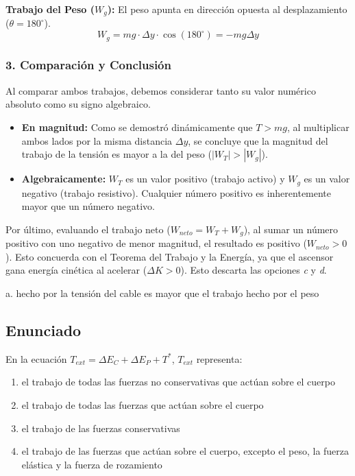 \documentclass[12pt, a4paper]{article}
\begin{document}
\textbf{Trabajo del Peso ($W_g$):}
El peso apunta en dirección opuesta al desplazamiento ($\theta = 180^\circ$).
$$W_g = mg \cdot \Delta y \cdot \cos(180^\circ) = -mg \Delta y$$

\subsubsection*{3. Comparación y Conclusión}
Al comparar ambos trabajos, debemos considerar tanto su valor numérico absoluto como su signo algebraico.
\begin{itemize}
    \item \textbf{En magnitud:} Como se demostró dinámicamente que $T > mg$, al multiplicar ambos lados por la misma distancia $\Delta y$, se concluye que la magnitud del trabajo de la tensión es mayor a la del peso ($|W_T| > |W_g|$).
    \item \textbf{Algebraicamente:} $W_T$ es un valor positivo (trabajo activo) y $W_g$ es un valor negativo (trabajo resistivo). Cualquier número positivo es inherentemente mayor que un número negativo.
\end{itemize}

Por último, evaluando el trabajo neto ($W_{neto} = W_T + W_g$), al sumar un número positivo con uno negativo de menor magnitud, el resultado es positivo ($W_{neto} > 0$). Esto concuerda con el Teorema del Trabajo y la Energía, ya que el ascensor gana energía cinética al acelerar ($\Delta K > 0$). Esto descarta las opciones \textit{c} y \textit{d}.

\begin{tcolorbox}[colback=green!5!white, colframe=green!50!black, title=Respuesta Correcta]
\centering \Large a. hecho por la tensión del cable es mayor que el trabajo hecho por el peso
\end{tcolorbox}

\newpage

\subsection*{Enunciado}
En la ecuación $T_{ext} = \Delta E_C + \Delta E_P + T^*$, $T_{ext}$ representa:
\begin{enumerate}[label=\alph*.]
    \item el trabajo de todas las fuerzas no conservativas que actúan sobre el cuerpo
    \item el trabajo de todas las fuerzas que actúan sobre el cuerpo
    \item el trabajo de las fuerzas conservativas
    \item el trabajo de las fuerzas que actúan sobre el cuerpo, excepto el peso, la fuerza elástica y la fuerza de rozamiento
\end{enumerate}
\end{document}
